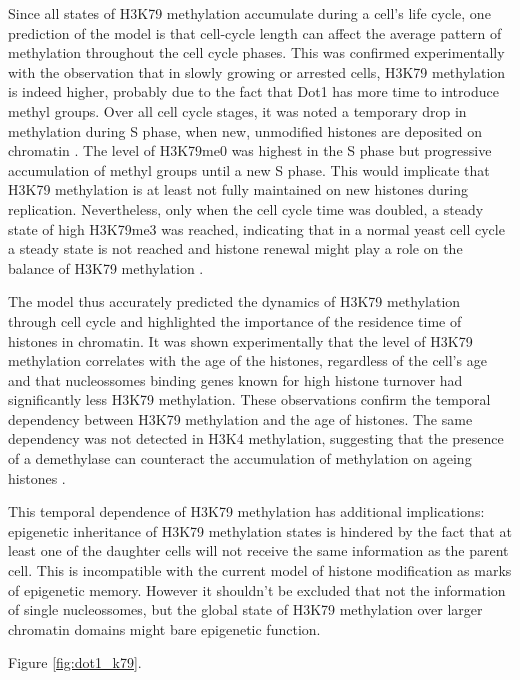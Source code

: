 \documentclass[11pt,twoside,a4paper]{report}
\begin{document}
		Since all states of H3K79 methylation accumulate during a cell's life cycle, one prediction of the model is that cell-cycle length can affect the average pattern of methylation throughout the cell cycle phases. This was confirmed experimentally with the observation that in slowly growing or arrested cells, H3K79 methylation is indeed higher, probably due to the fact that Dot1 has more time to introduce methyl groups. Over all cell cycle stages, it was noted a temporary drop in methylation during S phase, when new, unmodified histones are deposited on chromatin \cite{DeVos2011}. The level of H3K79me0 was highest in the S phase but progressive accumulation of methyl groups until a new S phase. This would implicate that H3K79 methylation is at least not fully maintained on new histones during replication. Nevertheless, only when the cell cycle time was doubled, a steady state of high H3K79me3 was reached, indicating that in a normal yeast cell cycle a steady state is not reached and histone renewal might play a role on the balance of H3K79 methylation \cite{DeVos2011}.
		
		The model thus accurately predicted the dynamics of H3K79 methylation through cell cycle and highlighted the importance of the residence time of histones in chromatin.	It was shown experimentally that the level of H3K79 methylation correlates with the age of the histones, regardless of the cell's age and that nucleossomes binding genes known for high histone turnover had significantly less H3K79 methylation. These observations confirm the temporal dependency between H3K79 methylation and the age of histones. The same dependency was not detected in H3K4 methylation, suggesting that the presence of a demethylase can counteract the accumulation of methylation on ageing histones \cite{DeVos2011}.
		
		This temporal dependence of H3K79 methylation has additional implications: epigenetic inheritance of H3K79 methylation states is hindered by the fact that at least one of the daughter cells will not receive the same information as the parent cell. This is incompatible with the current model of histone modification as marks of epigenetic memory. However it shouldn't be excluded that not the information of single nucleossomes, but the global state of H3K79 methylation over larger chromatin domains might bare epigenetic function.
		
		Figure \ref{fig:dot1_k79}.
		
\end{document}
